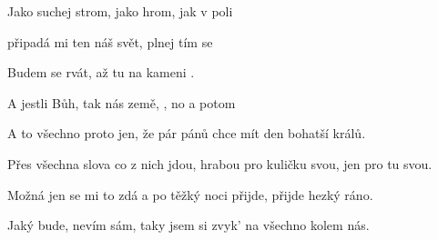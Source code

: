 

\zs
Jako  suchej strom, jako  hrom,
jak v poli 

připadá mi ten náš svět, plnej   tím 
 se 
\ks

\zr
Budem  se rvát, až tu   na 
kameni .

A jestli  Bůh, tak nás  země, 
, no a potom 
\kr


\zs
A to všechno proto jen, že pár pánů chce mít den bohatší králů.

Přes všechna slova co z nich jdou, hrabou pro kuličku svou, jen pro tu svou.
\ks


\zs
Možná jen se mi to zdá a po těžký noci přijde, přijde hezký ráno.

Jaký bude, nevím sám, taky jsem si zvyk' na všechno kolem nás.
\ks

\kp
